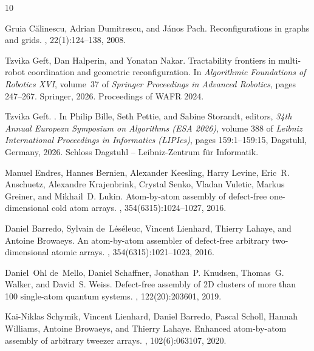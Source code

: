 \documentclass[a4paper,USenglish,thm-restate]{lipics-v2021}
\theoremstyle{problemstyle}
\begin{document}
\begin{thebibliography}{10}

Gruia C{\u a}linescu, Adrian Dumitrescu, and J{\'a}nos Pach.
\newblock Reconfigurations in graphs and grids.
, 22(1):124--138, 2008.

Tzvika Geft, Dan Halperin, and Yonatan Nakar.
\newblock Tractability frontiers in multi-robot coordination and geometric
  reconfiguration.
\newblock In {\em Algorithmic Foundations of Robotics {XVI}}, volume~37 of {\em
  Springer Proceedings in Advanced Robotics}, pages 247--267. Springer, 2026.
\newblock Proceedings of WAFR 2024.

Tzvika Geft.
.
\newblock In Philip Bille, Seth Pettie, and Sabine Storandt, editors, {\em 34th
  Annual European Symposium on Algorithms (ESA 2026)}, volume 388 of {\em
  Leibniz International Proceedings in Informatics (LIPIcs)}, pages
  159:1--159:15, Dagstuhl, Germany, 2026. Schloss Dagstuhl -- Leibniz-Zentrum
  f{\"u}r Informatik.

Manuel Endres, Hannes Bernien, Alexander Keesling, Harry Levine, Eric~R.
  Anschuetz, Alexandre Krajenbrink, Crystal Senko, Vladan Vuletic, Markus
  Greiner, and Mikhail~D. Lukin.
\newblock Atom-by-atom assembly of defect-free one-dimensional cold atom
  arrays.
, 354(6315):1024--1027, 2016.

Daniel Barredo, Sylvain de~L{\'e}s{\'e}leuc, Vincent Lienhard, Thierry Lahaye,
  and Antoine Browaeys.
\newblock An atom-by-atom assembler of defect-free arbitrary two-dimensional
  atomic arrays.
, 354(6315):1021--1023, 2016.

Daniel~Ohl de~Mello, Daniel Schaffner, Jonathan~P. Knudsen, Thomas~G. Walker,
  and David~S. Weiss.
\newblock Defect-free assembly of {2D} clusters of more than 100 single-atom
  quantum systems.
, 122(20):203601, 2019.

Kai-Niklas Schymik, Vincent Lienhard, Daniel Barredo, Pascal Scholl, Hannah
  Williams, Antoine Browaeys, and Thierry Lahaye.
\newblock Enhanced atom-by-atom assembly of arbitrary tweezer arrays.
, 102(6):063107, 2020.


\end{thebibliography}
\end{document}
